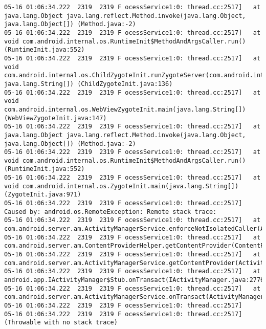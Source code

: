\begin{lstlisting}
05-16 01:06:34.222  2319  2319 F ocessService1:0: thread.cc:2517]   at java.lang.Object java.lang.reflect.Method.invoke(java.lang.Object, java.lang.Object[]) (Method.java:-2)
05-16 01:06:34.222  2319  2319 F ocessService1:0: thread.cc:2517]   at void com.android.internal.os.RuntimeInit$MethodAndArgsCaller.run() (RuntimeInit.java:552)
05-16 01:06:34.222  2319  2319 F ocessService1:0: thread.cc:2517]   at void com.android.internal.os.ChildZygoteInit.runZygoteServer(com.android.internal.os.ZygoteServer, java.lang.String[]) (ChildZygoteInit.java:136)
05-16 01:06:34.222  2319  2319 F ocessService1:0: thread.cc:2517]   at void com.android.internal.os.WebViewZygoteInit.main(java.lang.String[]) (WebViewZygoteInit.java:147)
05-16 01:06:34.222  2319  2319 F ocessService1:0: thread.cc:2517]   at java.lang.Object java.lang.reflect.Method.invoke(java.lang.Object, java.lang.Object[]) (Method.java:-2)
05-16 01:06:34.222  2319  2319 F ocessService1:0: thread.cc:2517]   at void com.android.internal.os.RuntimeInit$MethodAndArgsCaller.run() (RuntimeInit.java:552)
05-16 01:06:34.222  2319  2319 F ocessService1:0: thread.cc:2517]   at void com.android.internal.os.ZygoteInit.main(java.lang.String[]) (ZygoteInit.java:971)
05-16 01:06:34.222  2319  2319 F ocessService1:0: thread.cc:2517] Caused by: android.os.RemoteException: Remote stack trace:
05-16 01:06:34.222  2319  2319 F ocessService1:0: thread.cc:2517] 	at com.android.server.am.ActivityManagerService.enforceNotIsolatedCaller(ActivityManagerService.java:3079)
05-16 01:06:34.222  2319  2319 F ocessService1:0: thread.cc:2517] 	at com.android.server.am.ContentProviderHelper.getContentProvider(ContentProviderHelper.java:130)
05-16 01:06:34.222  2319  2319 F ocessService1:0: thread.cc:2517] 	at com.android.server.am.ActivityManagerService.getContentProvider(ActivityManagerService.java:6782)
05-16 01:06:34.222  2319  2319 F ocessService1:0: thread.cc:2517] 	at android.app.IActivityManager$Stub.onTransact(IActivityManager.java:2776)
05-16 01:06:34.222  2319  2319 F ocessService1:0: thread.cc:2517] 	at com.android.server.am.ActivityManagerService.onTransact(ActivityManagerService.java:2763)
05-16 01:06:34.222  2319  2319 F ocessService1:0: thread.cc:2517] 
05-16 01:06:34.222  2319  2319 F ocessService1:0: thread.cc:2517] (Throwable with no stack trace)
\end{lstlisting}
